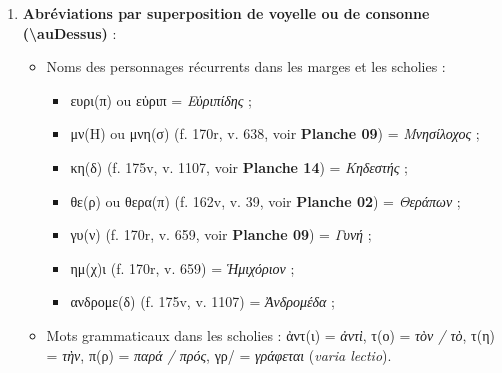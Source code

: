 \documentclass[11pt, a4paper, twoside]{article}
\renewcommand{\_}{\origunderscore\penalty0\relax}
\renewcommand{\texttt}[1]{#1}
\newcommand{\expo}[1]{\textsuperscript{#1}}
\newcommand{\auDessus}[2]{\ensuremath{\overset{\text{#2}}{\text{#1}}}}
\def\auDessus#1#2{#1(#2)}%
\def\expo#1{#1}%
\begin{document}
\begin{enumerate}[leftmargin=1.6em, itemsep=2pt]
  \item \textbf{Abréviations par superposition de voyelle ou de consonne (\texttt{\textbackslash auDessus})} :
  \begin{itemize}[leftmargin=1.5em, itemsep=2pt]
    \item Noms des personnages récurrents dans les marges et les scholies :
    \begin{itemize}[leftmargin=1.5em, itemsep=1pt]
      \item \texttt{ευρ\auDessus{ι}{π}} ou \texttt{εὐρι\expo{π}} = \textit{Εὐριπίδης} ;
      \item \texttt{μ\auDessus{ν}{Η}} ou \texttt{μν\auDessus{η}{σ}} (\texttt{f. 170r}, v. 638, voir \textbf{Planche 09}) = \textit{Μνησίλοχος} ;
      \item \texttt{κ\auDessus{η}{δ}} (\texttt{f. 175v}, v. 1107, voir \textbf{Planche 14}) = \textit{Κηδεστής} ;
      \item \texttt{θ\auDessus{ε}{ρ}} ou \texttt{θερ\auDessus{α}{π}} (\texttt{f. 162v}, v. 39, voir \textbf{Planche 02}) = \textit{Θεράπων} ;
      \item \texttt{γ\auDessus{υ}{ν}} (\texttt{f. 170r}, v. 659, voir \textbf{Planche 09}) = \textit{Γυνή} ;
      \item \texttt{η\auDessus{μ}{χ}ι} (\texttt{f. 170r}, v. 659) = \textit{Ἡμιχόριον} ;
      \item \texttt{ανδρομ\auDessus{ε}{δ}} (\texttt{f. 175v}, v. 1107) = \textit{Ἀνδρομέδα} ;
    \end{itemize}
    \item Mots grammaticaux dans les scholies : \texttt{ἀν\auDessus{τ}{ι}} = \textit{ἀντὶ}, \texttt{\auDessus{τ}{ο}} = \textit{τὸν / τὸ}, \texttt{\auDessus{τ}{η}} = \textit{τὴν}, \texttt{\auDessus{π}{ρ}} = \textit{παρά / πρός}, \texttt{γρ/} = \textit{γράφεται} (\textit{varia lectio}).
  \end{itemize}


\end{enumerate}
\end{document}
